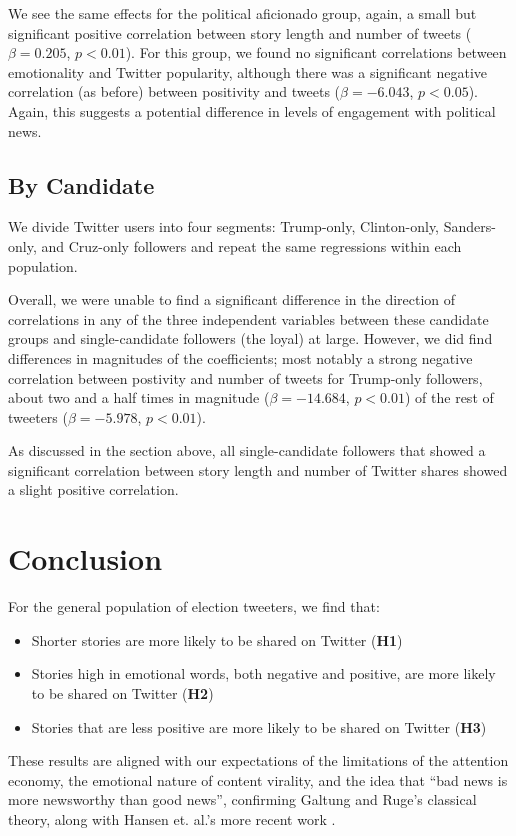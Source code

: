 \documentclass[letterpaper]{article}
\begin{document}
We see the same effects for the political aficionado group, again, a small but significant positive correlation between story length and number of tweets ($\beta=0.205$, $p<0.01$). For this group, we found no significant correlations between emotionality and Twitter popularity, although there was a significant negative correlation (as before) between positivity and tweets ($\beta=-6.043$, $p<0.05$). Again, this suggests a potential difference in levels of engagement with political news. 

\subsection{By Candidate} 
We divide Twitter users into four segments: Trump-only, Clinton-only, Sanders-only, and Cruz-only followers and repeat the same regressions within each population. 

Overall, we were unable to find a significant difference in the direction of correlations in any of the three independent variables between these candidate groups and single-candidate followers (the loyal) at large. However, we did find differences in magnitudes of the coefficients; most notably a strong negative correlation between postivity and number of tweets for Trump-only followers, about two and a half times in magnitude ($\beta=-14.684$, $p<0.01$) of the rest of tweeters ($\beta=−5.978$, $p<0.01$). 

As discussed in the section above, all single-candidate followers that showed a significant correlation between story length and number of Twitter shares showed a slight positive correlation.

\section{Conclusion}
For the general population of election tweeters, we find that:
\begin{itemize}
    \item Shorter stories are more likely to be shared on Twitter (\textbf{H1})
    \item Stories high in emotional words, both negative and positive, are more likely to be shared on Twitter (\textbf{H2})
    \item Stories that are less positive are more likely to be shared on Twitter (\textbf{H3})
\end{itemize}

These results are aligned with our expectations of the limitations of the attention economy, the emotional nature of content virality, and the idea that ``bad news is more newsworthy than good news'', confirming Galtung and Ruge's classical theory, along with Hansen et. al.'s more recent work \cite{galtung1965structure,hansen2011good}.
\end{document}

